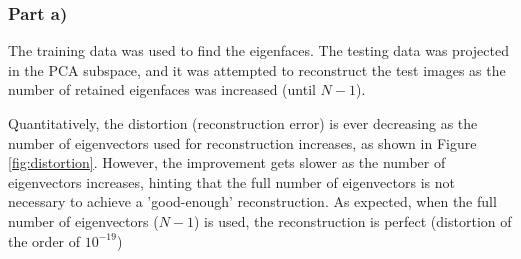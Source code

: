 \documentclass[10pt,technote]{IEEEtran}
\begin{document}
\subsubsection{Part a)}
The training data was used to find the eigenfaces. The testing data was projected in the PCA subspace, and it was attempted to reconstruct the test images as the number of retained eigenfaces was increased (until $N - 1$).

Quantitatively, the distortion (reconstruction error) is ever decreasing as the number of eigenvectors used for reconstruction increases, as shown in Figure \ref{fig:distortion}. However, the improvement gets slower as the number of eigenvectors increases, hinting that the full number of eigenvectors is not necessary to achieve a 'good-enough' reconstruction. As expected, when the full number of eigenvectors ($N - 1$) is used, the reconstruction is perfect (distortion of the order of $10^{-19}$)
\end{document}
